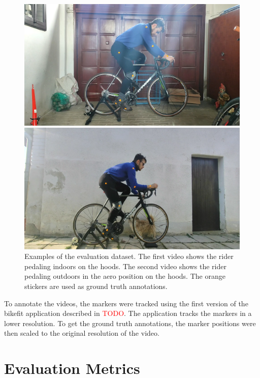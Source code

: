 \begin{figure}[htbp]

    \centering
    \includegraphics[width=1\linewidth]{obrazky-figures/eval_dataset_in_hoods.png}

    \includegraphics[width=1\linewidth]{obrazky-figures/eval_dataset_out_aero.png}

    \caption{Examples of the evaluation dataset. The first video shows the rider pedaling indoors on the hoods. The second video shows the rider pedaling outdoors in the aero position on the hoods. The orange stickers are used as ground truth annotations.}


    \label{fig:evaluation_markers}
\end{figure}

To annotate the videos, the markers were tracked using the first version of the bikefit application described in \textcolor{red}{TODO}. The application tracks the markers in a lower resolution. To get the ground truth annotations, the marker positions were then scaled to the original resolution of the video.

\section{Evaluation Metrics}
\label{evaluation_metrics}

